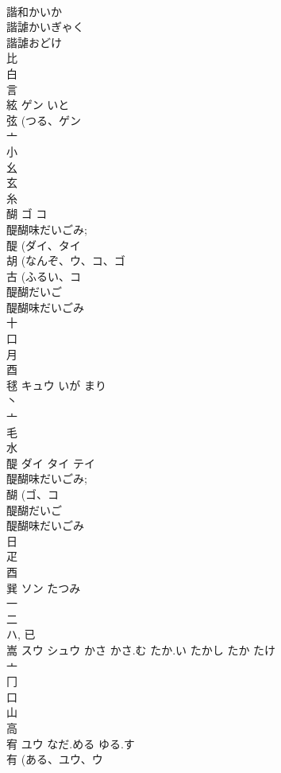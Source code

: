 \documentclass[8pt]{extreport}
\begin{document}
\begin{CJK}{UTF8}{min}
\\	諧和かいか
\\	諧謔かいぎゃく
\\	諧謔おどけ
\\	比 
\\	白 
\\	言 
\\	絃	ゲン	いと	
\\	弦 (つる、ゲン 
\\	亠 
\\	小 
\\	幺 
\\	玄 
\\	糸 
\\	醐	ゴ コ		
\\	醍醐味だいごみ; 
\\	醍 (ダイ、タイ 
\\	胡 (なんぞ、ウ、コ、ゴ 
\\	古 (ふるい、コ 
\\	醍醐だいご
\\	醍醐味だいごみ
\\	十 
\\	口 
\\	月 
\\	酉 
\\	毬	キュウ	いが まり	
\\	丶 
\\	亠 
\\	毛 
\\	水 
\\	醍	ダイ タイ テイ		
\\	醍醐味だいごみ; 
\\	醐 (ゴ、コ 
\\	醍醐だいご
\\	醍醐味だいごみ
\\	日 
\\	疋 
\\	酉 
\\	巽	ソン	たつみ	
\\	一 
\\	二 
\\	ハ, 已 
\\	嵩	スウ シュウ	かさ かさ.む たか.い たかし たか たけ	
\\	亠 
\\	冂 
\\	口 
\\	山 
\\	高 
\\	宥	ユウ	なだ.める ゆる.す	
\\	有 (ある、ユウ、ウ 

\end{CJK}
\end{document}
